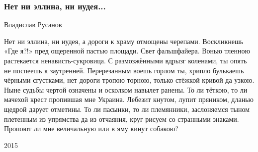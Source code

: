  
 
 

\subsubsection{Нет ни эллина, ни иудея...}
\label{sec:poetry.rus.dnr.vladislav_rusanov.ni_ellina_ni_iudeja}
Владислав Русанов

Нет ни эллина, ни иудея,
а дороги к храму отмощены
черепами. Воскликнешь «Где я?!»
пред ощеренной пастью площади.
Свет фальшфайера. Вонью тленною
растекается ненависть-сукровица.
С размозжёнными вдрызг коленами,
ты опять не поспеешь к заутренней.
Перерезанным воешь горлом ты,
хрипло булькаешь чёрными сгустками,
нет дороги тропою торною,
только стёжкой кривой да узкою.
Ныне судьбы чертой означены
и осколком навылет ранены.
То ли тёткою, то ли мачехой
крест пропившая мне Украина.
Лебезит кнутом, лупит пряником,
дланью щедрой дарует отметины.
То ли пасынки, то ли племянники,
заслоняемся тыном плетенным
из упрямства да из отчаяния,
круг рисуем со странными знаками.
Пропоют ли мне величальную
или в яму кинут собакою?

2015 
